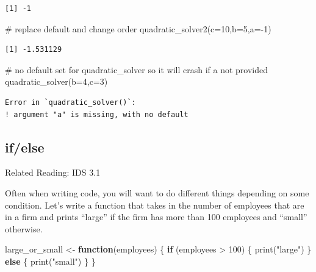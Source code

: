 \documentclass[
  letterpaper,
  DIV=11,
  numbers=noendperiod]{scrreprt}
\newenvironment{Shaded}{\begin{snugshade}}{\end{snugshade}}
\newcommand{\AttributeTok}[1]{\textcolor[rgb]{0.40,0.45,0.13}{#1}}
\newcommand{\CommentTok}[1]{\textcolor[rgb]{0.37,0.37,0.37}{#1}}
\newcommand{\ControlFlowTok}[1]{\textcolor[rgb]{0.00,0.23,0.31}{\textbf{#1}}}
\newcommand{\DecValTok}[1]{\textcolor[rgb]{0.68,0.00,0.00}{#1}}
\newcommand{\FunctionTok}[1]{\textcolor[rgb]{0.28,0.35,0.67}{#1}}
\newcommand{\NormalTok}[1]{\textcolor[rgb]{0.00,0.23,0.31}{#1}}
\newcommand{\OtherTok}[1]{\textcolor[rgb]{0.00,0.23,0.31}{#1}}
\newcommand{\SpecialCharTok}[1]{\textcolor[rgb]{0.37,0.37,0.37}{#1}}
\newcommand{\StringTok}[1]{\textcolor[rgb]{0.13,0.47,0.30}{#1}}
\begin{document}
\begin{verbatim}
[1] -1
\end{verbatim}

\begin{Shaded}
\begin{Highlighting}[]
\CommentTok{\# replace default and change order}
\FunctionTok{quadratic\_solver2}\NormalTok{(}\AttributeTok{c=}\DecValTok{10}\NormalTok{,}\AttributeTok{b=}\DecValTok{5}\NormalTok{,}\AttributeTok{a=}\SpecialCharTok{{-}}\DecValTok{1}\NormalTok{)}
\end{Highlighting}
\end{Shaded}

\begin{verbatim}
[1] -1.531129
\end{verbatim}

\begin{Shaded}
\begin{Highlighting}[]
\CommentTok{\# no default set for quadratic\_solver so it will crash if a not provided}
\FunctionTok{quadratic\_solver}\NormalTok{(}\AttributeTok{b=}\DecValTok{4}\NormalTok{,}\AttributeTok{c=}\DecValTok{3}\NormalTok{)}
\end{Highlighting}
\end{Shaded}

\begin{verbatim}
Error in `quadratic_solver()`:
! argument "a" is missing, with no default
\end{verbatim}

\subsection{if/else}\label{ifelse}

Related Reading: IDS 3.1

Often when writing code, you will want to do different things depending
on some condition. Let's write a function that takes in the number of
employees that are in a firm and prints ``large'' if the firm has more
than 100 employees and ``small'' otherwise.

\begin{Shaded}
\begin{Highlighting}[]
\NormalTok{large\_or\_small }\OtherTok{\textless{}{-}} \ControlFlowTok{function}\NormalTok{(employees) \{}
  \ControlFlowTok{if}\NormalTok{ (employees }\SpecialCharTok{\textgreater{}} \DecValTok{100}\NormalTok{) \{}
    \FunctionTok{print}\NormalTok{(}\StringTok{"large"}\NormalTok{)}
\NormalTok{  \} }\ControlFlowTok{else}\NormalTok{ \{}
    \FunctionTok{print}\NormalTok{(}\StringTok{"small"}\NormalTok{)}
\NormalTok{  \}}
\NormalTok{\}}
\end{Highlighting}
\end{Shaded}
\end{document}
